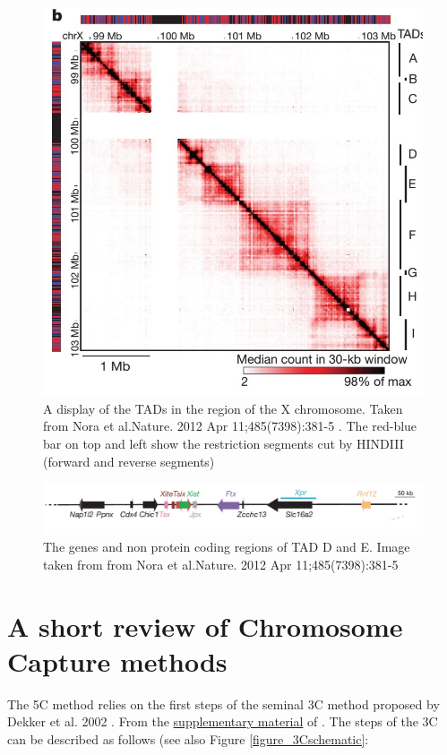 \documentclass[12pt]{book}
\begin{document}
 
\begin{figure}[H]
\includegraphics*[scale=0.5]{TADsOfTheXChromosome_NoraEtAl2012}
\caption{\scriptsize{A display of the TADs in the region of the X chromosome. Taken from Nora et al.Nature. 2012 Apr 11;485(7398):381-5 \cite{nora2012spatial}. The red-blue bar on top and left show the restriction segments cut by HINDIII (forward and reverse segments)}}
\label{figure_TADsOfTheXChromosome}
\end{figure}

\begin{figure}[H]
\includegraphics[scale=0.3]{geneSequencesTADDandE}
\caption{\scriptsize{The genes and non protein coding regions of TAD D and E. Image taken from from Nora et al.Nature. 2012 Apr 11;485(7398):381-5 \cite{nora2012spatial}}}
\label{figure_genesOfTadDandE}
\end{figure}

\section{A short review of Chromosome Capture methods}\label{section_chromosomeCaptureMethod}
The 5C method \cite{dostie2006chromosome} relies on the first steps of the seminal 3C method proposed by Dekker et al. 2002 \cite{dekker2002capturing}. 
From the \href{http://www.sciencemag.org/content/295/5558/1306/suppl/DC1}{supplementary material} of \cite{dekker2002capturing}. The steps of the 3C can be described as follows (see also Figure \ref{figure_3Cschematic}:
\end{document}
